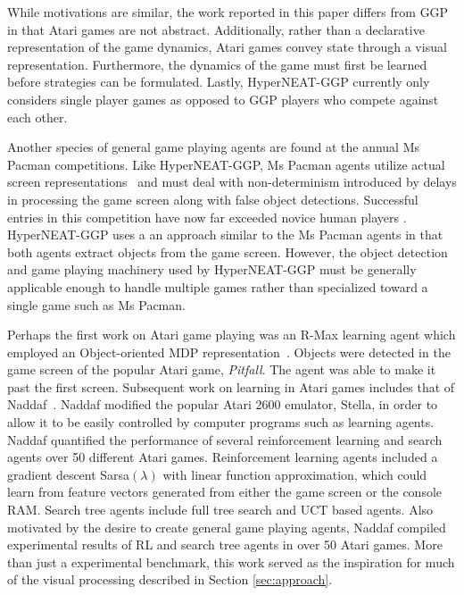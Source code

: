 \documentclass{acm_proc_article-sp}
\begin{document}
While motivations are similar, the work reported in this paper differs from GGP in that Atari games are not abstract. Additionally, rather than a declarative representation of the game dynamics, Atari games convey state through a visual representation. Furthermore, the dynamics of the game must first be learned before strategies can be formulated. Lastly, HyperNEAT-GGP currently only considers single player games as opposed to GGP players who compete against each other.

Another species of general game playing agents are found at the annual Ms Pacman competitions. Like HyperNEAT-GGP, Ms Pacman agents utilize actual screen representations~\cite{pacmancompetition} and must deal with non-determinism introduced by delays in processing the game screen along with false object detections. Successful entries in this competition have now far exceeded novice human players \cite{sigevolution2007}. HyperNEAT-GGP uses a an approach similar to the Ms Pacman agents in that both agents extract objects from the game screen. However, the object detection and game playing machinery used by HyperNEAT-GGP must be generally applicable enough to handle multiple games rather than specialized toward a single game such as Ms Pacman.

Perhaps the first work on Atari game playing was an R-Max learning agent which employed an Object-oriented MDP representation~\cite{duik08}. Objects were detected in the game screen of the popular Atari game, \emph{Pitfall}. The agent was able to make it past the first screen. Subsequent work on learning in Atari games includes that of Naddaf~\cite{naddaf10}. Naddaf modified the popular Atari 2600 emulator, Stella, in order to allow it to be easily controlled by computer programs such as learning agents. Naddaf quantified the performance of several reinforcement learning and search agents over 50 different Atari games. Reinforcement learning agents included a gradient descent Sarsa$(\lambda)$ with linear function approximation, which could learn from feature vectors generated from either the game screen or the console RAM. Search tree agents include full tree search and UCT based agents. Also motivated by the desire to create general game playing agents, Naddaf compiled experimental results of RL and search tree agents in over 50 Atari games. More than just a experimental benchmark, this work served as the inspiration for much of the visual processing described in Section \ref{sec:approach}.
\end{document}
